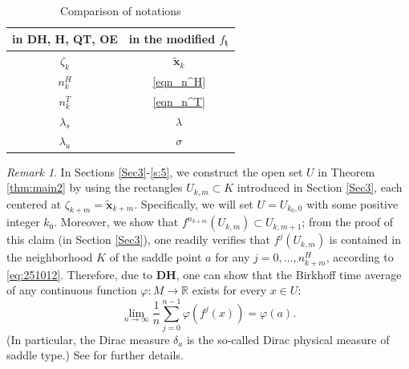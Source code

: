 \documentclass{amsart}
\theoremstyle{plain}
\theoremstyle{definition}
\theoremstyle{remark}
\newtheorem{remark}[thm]{Remark}
\numberwithin{equation}{section}
\begin{document}
\begin{table}[H]
\caption{Comparison of notations}
\begin{center}
\begin{tabular}{|c|c|}\hline
in {\bf DH}, {\bf H}, {\bf QT}, {\bf OE} & in the modified $f_{\underline{\boldsymbol{t}}}$\\ \hline
$\zeta_k$  &  $\widetilde{\boldsymbol{x}}_k$ \\ \hline
$n_k^H$  &  \eqref{eqn_n^H}\\ \hline
$n_k^T$  &  \eqref{eqn_n^T}\\ \hline
 $\lambda_{s}$  &  $\lambda$ \\ \hline
 $\lambda_{u}$ &  $\sigma$ \\ \hline
\end{tabular}
\label{tb_comparison}
\end{center}
\end{table}

\begin{remark}\label{rmk:1012}
In Sections \ref{Sec3}-\ref{s:5}, we construct the open set $U$ in Theorem \ref{thm:main2} by using the rectangles $U_{k,m}\subset K$ introduced in Section \ref{Sec3}, each centered at $\zeta_{k+m}=\widetilde{\boldsymbol{x}}_{k+m}$. 
Specifically, we will set $U=U_{k_0,0}$ with some positive integer $k_0$.
Moreover, we show that $f^{n_{k+m}}(U_{k,m})\subset U_{k,m+1}$; from the proof of this claim (in Section \ref{Sec3}), one readily verifies that $f^j(U_{k,m})$ is contained in the neighborhood $K$ of the saddle point $a$ for any $j=0,\ldots ,n_{k+m}^H$, according to \eqref{eq:251012}.
Therefore, due to {\textbf{DH}}, one can show that the Birkhoff time average of any continuous function $\varphi:M\to\mathbb R$
exists for every
$x\in U$:
\[
\lim_{n\to\infty}\frac{1}{n}\sum_{j=0}^{n-1}\varphi (f^j(x)) = \varphi (a).
\]
(In particular, the Dirac measure $\delta_a$ is the so-called Dirac physical measure of saddle type.)
See \cite[Section 4.4]{KLNS2022} for further details.
\end{remark}
\end{document}
